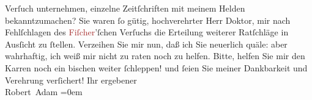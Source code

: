                Verſuch unternehmen, einzelne Zeitſchriften mit meinem Helden bekanntzumachen?\pend
           \pstart
           Sie waren ſo gütig, hochverehrter Herr Doktor, mir nach Fehlſchlagen des \textcolor{brown}{Fiſcher}{}\ledrightnote{\textcolor{brown}{S. Fischer Verlag}}’ſchen Verſuchs die Erteilung weiterer
               Ratſchläge in Ausſicht zu ſtellen. Verzeihen Sie mir nun, daß ich Sie neuerlich
               quäle: aber wahrhaftig, ich weiß mir nicht zu raten noch zu helfen.\pend
           \pstart
           Bitte, helfen Sie mir den Karren noch ein bischen weiter ſchleppen! und ſeien Sie
               meiner Dankbarkeit und {\pb}Verehrung verſichert!\pend
           \pstart
           Ihr ergebener{\\[\baselineskip]}\spacefill\mbox{Robert Adam}\pend
           \leftskip=0em{}\endnumbering{}  
      
